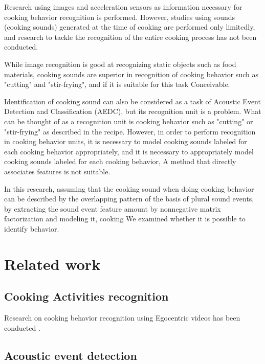\documentclass[sigchi]{acmart}
\begin{document}
Research using images and acceleration sensors as information necessary for cooking behavior recognition is performed\cite{Torre2008}\cite{Shimada2013}\cite{Kuehne2014}.
However, studies using sounds (cooking sounds) generated at the time of cooking are performed only limitedly\cite{Kojima2016}, and research to tackle the recognition of the entire cooking process has not been conducted.

While image recognition is good at recognizing static objects such as food materials, cooking sounds are superior in recognition of cooking behavior such as "cutting" and "stir-frying", and if it is suitable for this task Conceivable.

Identification of cooking sound can also be considered as a task of Acoustic Event Detection and Classification (AEDC), but its recognition unit is a problem.
What can be thought of as a recognition unit is cooking behavior such as "cutting" or "stir-frying" as described in the recipe. However, in order to perform recognition in cooking behavior units, it is necessary to model cooking sounds labeled for each cooking behavior appropriately, and it is necessary to appropriately model cooking sounds labeled for each cooking behavior, A method that directly associates features is not suitable\cite{Maijala2018}.

In this research, assuming that the cooking sound when doing cooking behavior can be described by the overlapping pattern of the basis of plural sound events, by extracting the sound event feature amount by nonnegative matrix factorization and modeling it, cooking We examined whether it is possible to identify behavior.


\section{Related work}
\subsection{Cooking Activities recognition}

Research on cooking behavior recognition using Egocentric videos has been conducted \cite{Urabe2018}.


\subsection{Acoustic event detection}
\end{document}
